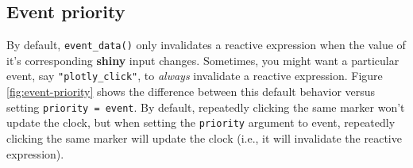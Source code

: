 \documentclass[
  12pt,
]{krantz}
\newenvironment{Shaded}{\begin{snugshade}}{\end{snugshade}}
\newcommand{\ControlFlowTok}[1]{\textcolor[rgb]{0.13,0.29,0.53}{\textbf{#1}}}
\newcommand{\DataTypeTok}[1]{\textcolor[rgb]{0.13,0.29,0.53}{#1}}
\newcommand{\DecValTok}[1]{\textcolor[rgb]{0.00,0.00,0.81}{#1}}
\newcommand{\KeywordTok}[1]{\textcolor[rgb]{0.13,0.29,0.53}{\textbf{#1}}}
\newcommand{\NormalTok}[1]{#1}
\newcommand{\OperatorTok}[1]{\textcolor[rgb]{0.81,0.36,0.00}{\textbf{#1}}}
\newcommand{\StringTok}[1]{\textcolor[rgb]{0.31,0.60,0.02}{#1}}
\begin{document}
\hypertarget{event-priority}{%
\subsection{Event priority}\label{event-priority}}

By default, \texttt{event\_data()} only invalidates a reactive expression when the value of it's corresponding \textbf{shiny} input changes. Sometimes, you might want a particular event, say \texttt{"plotly\_click"}, to \emph{always} invalidate a reactive expression. Figure \ref{fig:event-priority} shows the difference between this default behavior versus setting \texttt{priority\ =\ \textquotesingle{}event\textquotesingle{}}. By default, repeatedly clicking the same marker won't update the clock, but when setting the \texttt{priority} argument to event, repeatedly clicking the same marker will update the clock (i.e., it will invalidate the reactive expression).

\begin{Shaded}
\end{Shaded}
\end{document}
